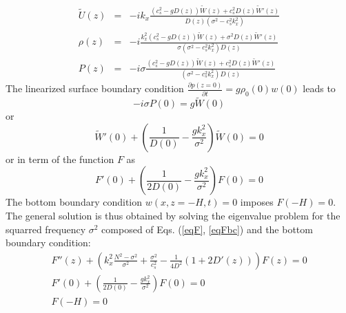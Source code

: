 \[
\begin{array}{rcl}
\widetilde{U}(z)&=&\displaystyle  -ik_x\frac{(c_s^2-gD(z))\widetilde{W}(z)+c_s^2D(z)\widetilde{W}'(z)}{D(z)(\sigma^2-c_s^2k_x^2)}\\[4mm]
\rho(z)&=&\displaystyle -i\frac{k_x^2(c_s^2-gD(z))\widetilde{W}(z)+\sigma^2D(z)\widetilde{W}'(z)}{\sigma(\sigma^2-c_s^2k_x^2)D(z)}\\[4mm]
P(z)&=&\displaystyle -i\sigma\frac{(c_s^2-gD(z))\widetilde{W}(z)+c_s^2D(z)\widetilde{W}'(z)}{(\sigma^2-c_s^2k_x^2)D(z)}
\end{array}
\]
The linearized surface boundary condition $\displaystyle \frac{\partial p(z=0)}{\partial t}=g \rho_0(0)w(0)$ leads to
\[
-i\sigma P(0)=g \widetilde{W}(0)
\]
or
\[
\widetilde{W}'(0)+\left(
\frac{1}{D(0)}-\frac{gk_x^2}{\sigma^2}
\right)\widetilde{W}(0)=0
\]
or in term of the function $F$ as
\begin{equation}
F'(0)+\left(
\frac{1}{2D(0)}-\frac{gk_x^2}{\sigma^2}
\right)F(0)=0
\label{eqFbc}
\end{equation}
The bottom boundary condition $w(x,z=-H,t)=0$ imposes $F(-H)=0$. The general solution is thus obtained by solving the eigenvalue problem for the squarred frequency $\sigma^2$ composed of Eqs. (\ref{eqF}, \ref{eqFbc}) and the bottom boundary condition:
\[
\begin{array}{l}
\displaystyle
F''(z)
+\left(
k_x^2\frac{N^2-\sigma^2}{\sigma^2}
+
\frac{\sigma^2}{c_s^2}-\frac{1}{4D^2}(1+2D'(z))
\right)
F(z)=0\\[4mm]
\displaystyle
F'(0)+\left(
\frac{1}{2D(0)}-\frac{gk_x^2}{\sigma^2}
\right)F(0)=0\\[4mm]
\displaystyle
F(-H)=0
\end{array}
\]
%
